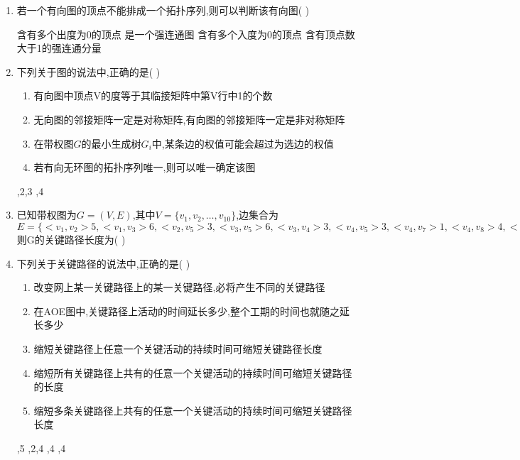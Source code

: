 \documentclass[12pt, a4paper, oneside, UTF8]{ctexbook}
\begin{document}
\begin{enumerate}
    \item 若一个有向图的顶点不能排成一个拓扑序列,则可以判断该有向图(    ) 
    \begin{choices}[2]
        \task 含有多个出度为0的顶点
        \task 是一个强连通图
        \task 含有多个入度为0的顶点
        \task 含有顶点数大于1的强连通分量 
    \end{choices}

    \item 下列关于图的说法中,正确的是(   ) 
    \begin{enumerate}
        \item [(1)] 有向图中顶点V的度等于其临接矩阵中第V行中1的个数
        \item [(2)] 无向图的邻接矩阵一定是对称矩阵,有向图的邻接矩阵一定是非对称矩阵
        \item [(3)] 在带权图$G$的最小生成树$G_i$中,某条边的权值可能会超过为选边的权值
        \item [(4)] 若有向无环图的拓扑序列唯一,则可以唯一确定该图 
    \end{enumerate}
    \begin{choices}
        ,2,3
        ,4
    \end{choices}

    \item 已知带权图为$G=(V,E)$,其中$V=\{v_1,v_2,\ldots,v_{10}\}$,边集合为$E=\{<v_1,v_2>5,
    <v_1,v_3>6,<v_2,v_5>3,<v_3,v_5>6,<v_3,v_4>3,<v_4,v_5>3,<v_4,v_7>1,<v_4,v_8>4,<v_5,v_6>4,
    <v_5,v_7>2,<v_6,v_{10}>4,<v_7,v_9>5,<v_8,v_9>2,<v_9,v_{10}>2\}$则G的关键路径长度为(   ) 

    \answer{
        
    }

    \item 下列关于关键路径的说法中,正确的是(   ) 
    \begin{enumerate}
        \item [(1)]改变网上某一关键路径上的某一关键路径,必将产生不同的关键路径
        \item [(2)]在AOE图中,关键路径上活动的时间延长多少,整个工期的时间也就随之延长多少
        \item [(3)]缩短关键路径上任意一个关键活动的持续时间可缩短关键路径长度
        \item [(4)]缩短所有关键路径上共有的任意一个关键活动的持续时间可缩短关键路径的长度
        \item [(5)]缩短多条关键路径上共有的任意一个关键活动的持续时间可缩短关键路径长度 
    \end{enumerate}
    \begin{choices}
        ,5
        ,2,4
        ,4
        ,4
    \end{choices}


\end{enumerate}
\end{document}
